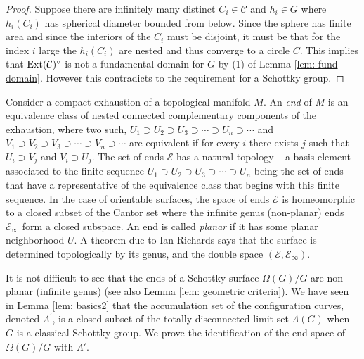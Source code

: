 \documentclass[12pt]{amsart}
\theoremstyle{plain}
\DeclareMathOperator{\Ext}{\rm Ext}
\begin{document}
\begin{proof} 
Suppose there are infinitely  many distinct  
$C_i \in \mathcal{C}$ and $h_i \in G$ where $h_i (C_i)$ has spherical diameter bounded from below. Since the sphere has finite area and since the interiors of the $C_i$ must be disjoint,  it must be that for the index $i$ large the $h_i (C_i)$ are nested and thus converge to a circle $C$. This implies that 
$\Ext (\mathcal{C})^{\circ}$ is not a fundamental domain for $G$ by (1) of Lemma \ref{lem: fund domain}. 
However this contradicts to the requirement for a Schottky group.
\end{proof}

Consider a compact exhaustion of a topological manifold $M$.
An {\it end}  of $M$ is an equivalence class of nested connected complementary components of the exhaustion,
where  two such, $U_{1} \supset U_{2} 
\supset U_{3}\supset \cdots \supset U_{n} \supset \cdots$
and $V_{1} \supset V_{2} 
\supset V_{3}\supset \cdots \supset V_{n} \supset \cdots$ are equivalent
if for every $i$ there exists $j$ such that $U_i \supset V_j$ and $V_i \supset U_j$.
The set of ends $\mathcal{E}$ has a natural topology -- a basis element associated to 
the finite sequence $U_{1} \supset U_{2} 
\supset U_{3}\supset \cdots \supset U_{n} $ being the set of ends that  have a representative of the equivalence class that begins with this finite sequence. In the case of orientable surfaces, the space of ends $\mathcal{E}$ is homeomorphic to a  closed subset of the
Cantor set where  the infinite genus  (non-planar) ends
 $\mathcal{E_{\infty}} $ form a closed subspace. 
An end is called {\it planar} if it has some planar neighborhood $U$. 
 A theorem due to Ian Richards \cite{R} says that the surface is determined 
 topologically by its genus, and the double space $\left(\mathcal{E}, \mathcal{E_{\infty}}\right)$. 

It is not difficult to see that the ends of a Schottky surface 
$\Omega(G)/G$ are 
 non-planar (infinite genus) (see also Lemma \ref{lem: geometric criteria}). 
We have seen in Lemma \ref{lem: basics2} that the accumulation set of the configuration curves, denoted $\Lambda^{\prime}$,  
is a closed subset of the totally disconnected limit set $\Lambda(G)$ when $G$ is a classical Schottky group. We prove the identification of the end space of $\Omega(G)/G$ with $\Lambda'$.
\end{document}
